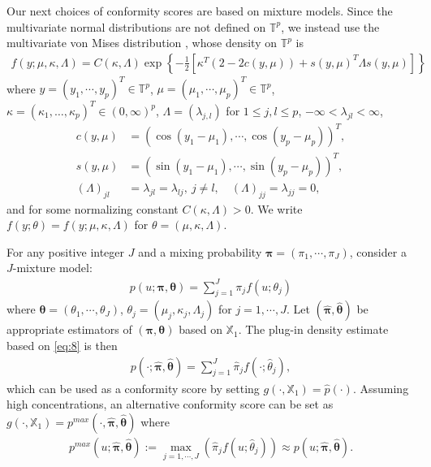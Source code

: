 Our next choices of conformity scores are based on mixture models. Since the multivariate normal distributions are not defined on $\mathbb{T}^p$, we instead use the multivariate von Mises distribution \citep{Mardia:2008}, whose density on $\mathbb{T}^p$ is
\begin{align}\label{eq:7}
f\left(y;\mu,\kappa, \Lambda\right) = C\left(\kappa,\Lambda\right)\exp\left\{-\frac{1}{2}\left[\kappa^T\left(2 - 2c\left(y,\mu\right)\right)+s\left(y,\mu\right)^T\Lambda s\left(y,\mu\right)\right]\right\}
\end{align}
where $y = \left(y_1,\cdots,y_p\right)^T  \in\mathbb{T}^p$, $\mu = \left(\mu_1,\cdots,\mu_p\right)^T \in\mathbb{T}^p$, ${\kappa} = (\kappa_1,\ldots,\kappa_p)^T \in (0,\infty)^p$, $\Lambda = (\lambda_{j,l})$  for $1\le j,l \le p$, $-\infty < \lambda_{jl} < \infty$,
\begin{align*}
    c\left(y,\mu\right) &= \left(\cos\left(y_1-\mu_1\right),\cdots, \cos\left(y_p-\mu_p\right)\right)^T,\\
    s\left(y,\mu\right) &= \left(\sin\left(y_1-\mu_1\right),\cdots, \sin\left(y_p-\mu_p\right)\right)^T,\\
    \left(\Lambda\right)_{jl}&=\lambda_{jl}=\lambda_{lj},~j\ne l,\quad \left(\Lambda\right)_{jj}=\lambda_{jj}=0,
\end{align*}
and for some normalizing constant $C\left(\kappa,\Lambda\right)>0$. We write $f\left(y;\theta\right) = f\left(y;\mu,\kappa,\Lambda\right)$ for $\theta = (\mu,\kappa,\Lambda)$.

For any positive integer $J$ and a mixing probability $\boldsymbol{\pi} = \left(\pi_1,\cdots,\pi_J\right)$, consider a $J$-mixture model:
\begin{align}\label{eq:8}
    p\left(u;\boldsymbol{\pi},\boldsymbol{\theta}\right) = \sum_{j=1}^J\pi_jf\left(u;\theta_j\right)
\end{align}
where $\boldsymbol{\theta} = \left(\theta_1,\cdots,\theta_J\right)$, $\theta_j = (\mu_{j}, \kappa_{j}, \Lambda_j)$ for $j=1,\cdots,J$. Let $\left(\hat{\boldsymbol{\pi}}, \hat{\boldsymbol{\theta}}\right)$ be appropriate estimators of $\left(\boldsymbol{\pi}, \boldsymbol{\theta}\right)$ based on $\mathbb{X}_1$. The plug-in density estimate based on \eqref{eq:8} is then
\begin{align}\label{eq:9}
    p\left(\cdot;\hat{\boldsymbol{\pi}},\hat{\boldsymbol{\theta}}\right) = \sum_{j=1}^J\hat{\pi}_jf\left(\cdot;\hat{\theta}_j\right),
\end{align}
which can be used as a conformity score by setting $g\left(\cdot,\mathbb{X}_1\right)=\hat{p}\left(\cdot\right)$. Assuming high concentrations, an alternative conformity score can be set as $g\left(\cdot,\mathbb{X}_1\right)=p^{max}\left(\cdot,\hat{\boldsymbol{\pi}},\hat{\boldsymbol{\theta}}\right)$ where
\begin{align}\label{eq:10}
     p^{max}\left(u;\hat{\boldsymbol{\pi}},\hat{\boldsymbol{\theta}}\right):=\max_{j=1,\cdots,J}\left(\hat{\pi}_jf\left(u;\hat{\theta}_j\right)\right)\approx p\left(u;\hat{\boldsymbol{\pi}},\hat{\boldsymbol{\theta}}\right).
\end{align}

